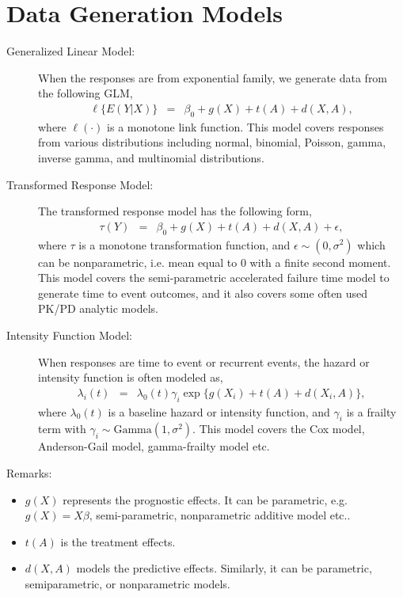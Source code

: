 \documentclass[12pt]{article}
\begin{document}
\section{Data Generation Models} \label{sec.DataGenModels}
\begin{description}
	\item[Generalized Linear Model:] When the responses are from exponential family, we generate data from the following GLM,
	\begin{eqnarray*}
		\ell\{E(Y|X)\} &=& \beta_0 + g(X) + t(A) + d(X,A),
	\end{eqnarray*}
	where $\ell(\cdot)$ is a monotone link function. This model covers responses from various distributions including normal, binomial, Poisson, gamma, inverse gamma, and multinomial distributions.
	\item[Transformed Response Model:] The transformed response model has the following form,
	\begin{eqnarray*}
		\tau(Y) &=& \beta_0 + g(X) + t(A) + d(X,A)+\epsilon,
	\end{eqnarray*}
	where $\tau$ is a monotone transformation function, and $\epsilon \sim (0,\sigma^2)$ which can be nonparametric, i.e. mean equal to 0 with a finite second moment. This model covers the semi-parametric accelerated failure time model to generate time to event outcomes, and it also covers some often used PK/PD analytic models.
	\item[Intensity Function Model:] When responses are time to event or recurrent events, the hazard or intensity function is often modeled as,
	\begin{eqnarray*}
		\lambda_i(t) &=& \lambda_0(t)\gamma_i \exp\{g(X_i)+ t(A)+d(X_i,A)\},
	\end{eqnarray*}
	where $\lambda_0(t)$ is a baseline hazard or intensity function, and $\gamma_i$ is a frailty term with $\gamma_i \sim \mbox{Gamma}(1,\sigma^2)$. This model covers the Cox model, Anderson-Gail model, gamma-frailty model etc.
\end{description}

Remarks:
\begin{itemize}
	\item $g(X)$ represents the prognostic effects. It can be parametric, e.g. $g(X) = X\beta$, semi-parametric, nonparametric additive model etc..
	\item $t(A)$ is the treatment effects.
	\item $d(X,A)$ models the predictive effects. Similarly, it can be parametric, semiparametric, or nonparametric models.

\end{itemize}
\end{document}
